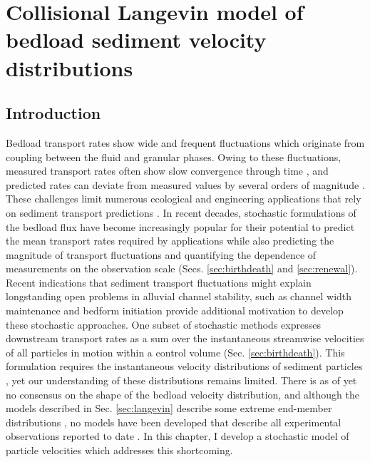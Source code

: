 
\chapter{Collisional Langevin model of bedload sediment velocity distributions}
\label{ch:langevin}
\section{Introduction}

Bedload transport rates show wide and frequent fluctuations which originate from coupling between the fluid and granular phases.
Owing to these fluctuations, measured transport rates often show slow convergence through time \citep{Dhont2018,Turowski2010}, and predicted rates can deviate from measured values by several orders of magnitude \citep{Recking2012,Martin2003}.
These challenges limit numerous ecological and engineering applications that rely on sediment transport predictions \citep{Gaeuman2017,Malmon2005}.
In recent decades, stochastic formulations of the bedload flux have become increasingly popular for their potential to predict the mean transport rates required by applications while also predicting the magnitude of transport fluctuations and quantifying the dependence of measurements on the observation scale (Secs. \ref{sec:birthdeath} and \ref{sec:renewal}).
Recent indications that sediment transport fluctuations might explain longstanding open problems in alluvial channel stability, such as channel width maintenance \citep{Abramian2019,Abramian2020} and bedform initiation \citep{Jerolmack2005,Bohorquez2016} provide additional motivation to develop these stochastic approaches.
One subset of stochastic methods expresses downstream transport rates as a sum over the instantaneous streamwise velocities of all particles in motion within a control volume (Sec. \ref{sec:birthdeath}).
This formulation requires the instantaneous velocity distributions of sediment particles \citep[e.g.][]{Ancey2020a}, yet our understanding of these distributions remains limited.
There is as of yet no consensus on the shape of the bedload velocity distribution, and although the models described in Sec. \ref{sec:langevin} describe some extreme end-member distributions \citep[e.g.][]{Fan2014,Ancey2014}, no models have been developed that describe all experimental observations reported to date \citep{Lajeunesse2010,Fathel2015,Heyman2016,Liu2019,Houssais2012}.
In this chapter, I develop a stochastic model of particle velocities which addresses this shortcoming.

